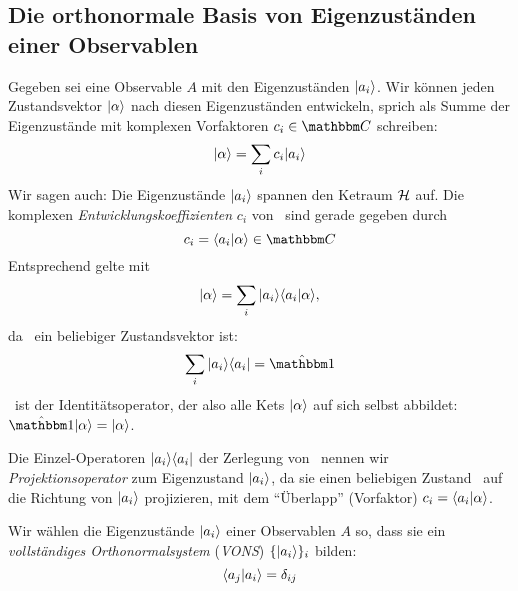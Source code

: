 \subsection{Die orthonormale Basis von Eigenzust\"anden einer Observablen}
\begin{post}
 Gegeben sei eine Observable $A$ mit den Eigenzust\"anden $\ket{a_i}$. Wir k\"onnen jeden Zustandsvektor $\keta$ nach diesen Eigenzust\"anden entwickeln, sprich als Summe der Eigenzust\"ande mit komplexen Vorfaktoren $c_i \in \comps$ schreiben:
\begin{equation}
 \keta = \sum_i c_i \ket{a_i}
\end{equation}
Wir sagen auch: Die Eigenzust\"ande $\ket{a_i}$ spannen den Ketraum $\mathcal{H}$ auf. Die komplexen \emph{Entwicklungskoeffizienten} $c_i$ von \keta\ sind gerade gegeben durch
 \begin{equation}
  c_i = \braket{a_i | \alpha} \in \comps
 \end{equation}
Entsprechend gelte mit
\begin{equation}
 \keta = \sum_i \ket{a_i}\braket{a_i|\alpha},
\end{equation}
da \keta\ ein beliebiger Zustandsvektor ist:
\begin{equation}
 \sum_i\ket{a_i}\bra{a_i} = \opi
\end{equation}
\opi\ ist der Identit\"atsoperator, der also alle Kets $\keta$ auf sich selbst abbildet: $\opi \keta = \keta$.
\end{post}

\begin{defn}
 Die Einzel-Operatoren $\ket{a_i}\bra{a_i}$ der Zerlegung von \opi\ nennen wir \emph{Projektionsoperator} zum Eigenzustand $\ket{a_i}$, da sie einen beliebigen Zustand \keta\ auf die Richtung von $\ket{a_i}$ projizieren, mit dem \enquote{\"Uberlapp} (Vorfaktor) $c_i = \braket{a_i | \alpha}$.
\end{defn}

\begin{defn}
 Wir w\"ahlen die Eigenzust\"ande $\ket{a_i}$ einer Observablen $A$ so, dass sie ein \emph{vollst\"andiges Orthonormalsystem} (\emph{VONS}) $\{\ket{a_i}\}_i$ bilden:
 \begin{equation}
  \braket{a_j | a_i} = \delta_{ij}
 \end{equation}
\end{defn}

